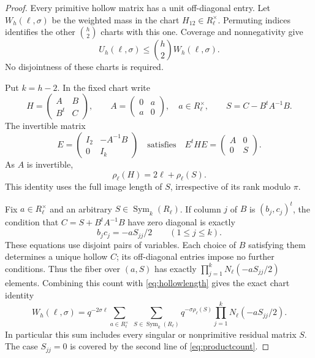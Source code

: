 \documentclass[11pt]{article}
\numberwithin{equation}{section}
\theoremstyle{remark}
\newcommand{\Sym}{\operatorname{Sym}}
\begin{document}
\begin{proof}
Every primitive hollow matrix has a unit off-diagonal entry.
Let $W_h(\ell,\sigma )$ be the weighted mass in the chart $H_{12}\in R_\ell^\times$.
Permuting indices identifies the other $\binom h2$ charts with this
one. Coverage and nonnegativity give
\begin{equation}\label{eq:hollowcover}
 U_h(\ell,\sigma )\le\binom h2 W_h(\ell,\sigma ).
\end{equation}
No disjointness of these charts is required.

Put $k=h-2$. In the fixed chart write
\[
 H=\begin{pmatrix}A&B\\ B^t&C\end{pmatrix},\qquad
 A=\begin{pmatrix}0&a\\a&0\end{pmatrix},\quad a\in R_\ell^\times,
 \qquad S=C-B^tA^{-1}B.
\]
The invertible matrix
\[
 E=\begin{pmatrix}I_2&-A^{-1}B\\0&I_k\end{pmatrix}
 \quad\text{satisfies}\quad
 E^tHE=\begin{pmatrix}A&0\\0&S\end{pmatrix}.
\]
As $A$ is invertible,
\begin{equation}\label{eq:hollowlength}
 \rho_\ell(H)=2\ell+\rho_\ell(S).
\end{equation}
This identity uses the full image length of $S$, irrespective of its
rank modulo $\pi$.

Fix $a\in R_\ell^\times$ and an arbitrary $S\in\Sym_k(R_\ell)$.
If column $j$ of $B$ is $(b_j,c_j)^t$, the condition that
$C=S+B^tA^{-1}B$ have zero diagonal is exactly
\[
 b_jc_j=-aS_{jj}/2\qquad(1\le j\le k).
\]
These equations use disjoint pairs of variables. Each choice of $B$
satisfying them determines a unique hollow $C$; its off-diagonal
entries impose no further conditions. Thus the fiber over $(a,S)$
has exactly $\prod_{j=1}^k N_\ell(-aS_{jj}/2)$ elements. Combining
this count with \eqref{eq:hollowlength} gives the exact chart identity
\begin{equation}\label{eq:hollowexact}
 W_h(\ell,\sigma )=q^{-2\sigma \ell}
   \sum_{a\in R_\ell^\times}\ 
   \sum_{S\in\Sym_k(R_\ell)}
      q^{-\sigma \rho_\ell(S)}\prod_{j=1}^k N_\ell(-aS_{jj}/2).
\end{equation}
In particular this sum includes every singular or nonprimitive
residual matrix $S$. The case $S_{jj}=0$ is covered by the second
line of \eqref{eq:productcount}.


\end{proof}
\end{document}
